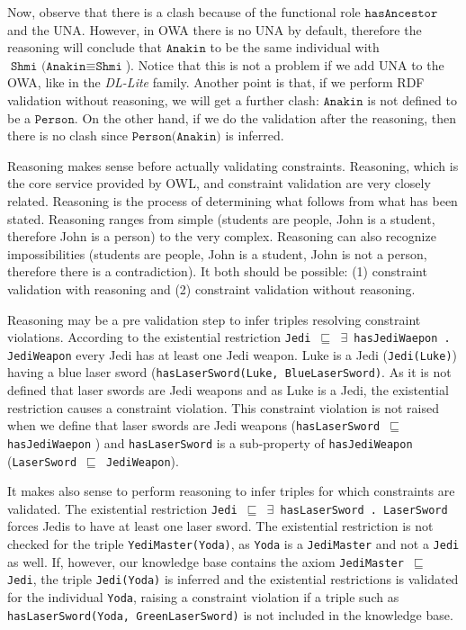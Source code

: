 \documentclass{llncs}
\newcommand{\ms}[1]{\texttt{#1}}
\begin{document}
\noindent Now, observe that there is a clash because of the functional role $\ms{hasAncestor}$ and the UNA. However, in OWA there is no UNA by default, therefore the reasoning will conclude that  $\ms{Anakin}$ to be the same individual with $\ms{Shmi (Anakin} \equiv \ms{Shmi}$). Notice that this is not a problem if we add UNA to the OWA, like in the \textit{DL-Lite} family.
Another point is that, if we perform RDF validation without reasoning, we will get a further clash: $\ms{Anakin}$ is not defined to be a $\ms{Person}$. On the other hand, if we do the validation after the reasoning, then there is no clash since $\ms{Person(Anakin)}$ is inferred. 


Reasoning makes sense before actually validating constraints.
Reasoning, which is the core service provided by OWL,
and constraint validation are very closely related. 
Reasoning is the process of determining what follows from what has been
stated.  Reasoning ranges from simple (students are people, John is a
student, therefore John is a person) to the very complex. Reasoning can
also recognize impossibilities (students are people, John is a student, John
is not a person, therefore there is a contradiction). 
It both should be possible: (1) constraint validation with reasoning and (2) constraint validation without reasoning. 

Reasoning may be a pre validation step to infer triples resolving constraint violations.
According to the existential restriction \ms{Jedi $\sqsubseteq$ $\exists$ hasJediWaepon . JediWeapon} every Jedi has at least one Jedi weapon.
Luke is a Jedi (\ms{Jedi(Luke)}) having a blue laser sword (\ms{hasLaserSword(Luke, BlueLaserSword)}.
As it is not defined that laser swords are Jedi weapons and as Luke is a Jedi, the existential restriction causes a constraint violation. 
This constraint violation is not raised when we define that laser swords are Jedi weapons (\ms{hasLaserSword $\sqsubseteq$ hasJediWaepon} ) 
and \ms{hasLaserSword} is a sub-property of \ms{hasJediWeapon} (\ms{LaserSword $\sqsubseteq$ JediWeapon}).

It makes also sense to perform reasoning to infer triples for which constraints are validated.
The existential restriction \ms{Jedi $\sqsubseteq$ $\exists$ hasLaserSword . LaserSword} forces Jedis to have at least one laser sword.
The existential restriction is not checked for the triple \ms{YediMaster(Yoda)}, as \ms{Yoda} is a \ms{JediMaster} and not a \ms{Jedi} as well.
If, however, our knowledge base contains the axiom \ms{JediMaster $\sqsubseteq$ Jedi}, the triple \ms{Jedi(Yoda)} is inferred and the existential restrictions is validated for the individual \ms{Yoda}, raising a constraint violation if a triple such as \ms{hasLaserSword(Yoda, GreenLaserSword)} is not included in the knowledge base. 
\end{document}
